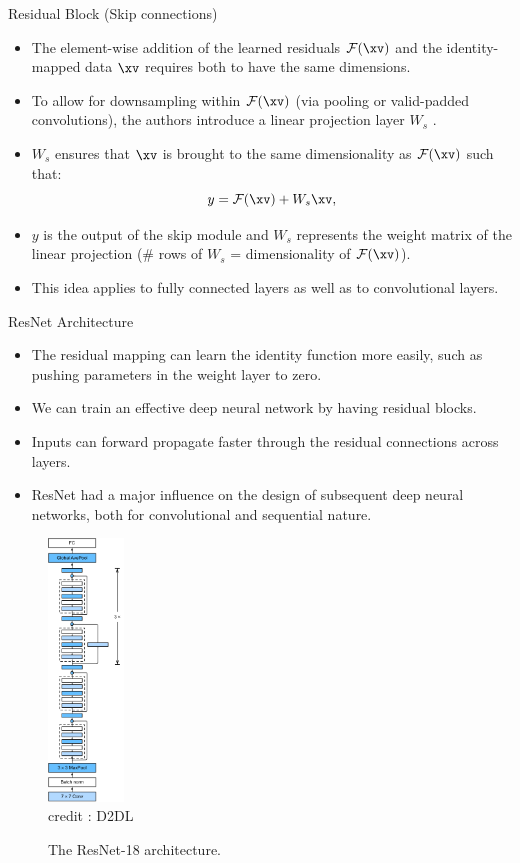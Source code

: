 \begin{vbframe}{Residual Block (Skip connections)}
\framebreak


    \begin{itemize}
        \item The element-wise addition of the learned residuals $\mathcal{F}(\xv)$ and the identity-mapped data $\xv$ requires both to have the same dimensions.
        \item To allow for downsampling within $\mathcal{F}(\xv)$ (via pooling or valid-padded convolutions), the authors introduce a linear projection layer $W_s$ .
        \item $W_s$ ensures that $\xv$ is brought to the same dimensionality as $\mathcal{F}(\xv)$ such that:
        $$
            y = \mathcal{F}(\xv) + W_s\xv,
        $$
        \item $y$ is the output of the skip module and $W_s$ represents the weight matrix of the linear projection (\# rows of $W_s$ = dimensionality of $\mathcal{F}(\xv)$).
        \item This idea applies to fully connected layers as well as to convolutional layers.
    \end{itemize}
\end{vbframe}


\framebreak

\begin{vbframe}{ResNet Architecture}
    \begin{itemize}
        \item The residual mapping can learn the identity function more easily, such as pushing parameters in the weight layer to zero.
        \item We can train an effective deep neural network by having residual blocks.
        \item Inputs can forward propagate faster through the residual connections across layers.
        \item ResNet had a major influence on the design of subsequent deep neural networks, both for convolutional and sequential nature.
    \end{itemize}
    
     \begin{figure}
  \centering
    \includegraphics[width=2cm]{plots/moderncnn/resnet18.png}
    \tiny{\\ credit : D2DL}
    \caption{The ResNet-18 architecture.}
  \end{figure}
  
 \end{vbframe}

